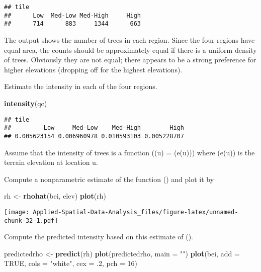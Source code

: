 \documentclass[
]{book}
\newenvironment{Shaded}{\begin{snugshade}}{\end{snugshade}}
\newcommand{\DataTypeTok}[1]{\textcolor[rgb]{0.13,0.29,0.53}{#1}}
\newcommand{\DecValTok}[1]{\textcolor[rgb]{0.00,0.00,0.81}{#1}}
\newcommand{\FloatTok}[1]{\textcolor[rgb]{0.00,0.00,0.81}{#1}}
\newcommand{\KeywordTok}[1]{\textcolor[rgb]{0.13,0.29,0.53}{\textbf{#1}}}
\newcommand{\NormalTok}[1]{#1}
\newcommand{\OtherTok}[1]{\textcolor[rgb]{0.56,0.35,0.01}{#1}}
\newcommand{\StringTok}[1]{\textcolor[rgb]{0.31,0.60,0.02}{#1}}
\begin{document}
\begin{verbatim}
## tile
##      Low  Med-Low Med-High     High 
##      714      883     1344      663
\end{verbatim}

The output shows the number of trees in each region. Since the four regions have equal area, the counts should be approximately equal if there is a uniform density of trees. Obviously they are not equal; there appears to be a strong preference for higher elevations (dropping off for the highest elevations).

Estimate the intensity in each of the four regions.

\begin{Shaded}
\begin{Highlighting}[]
\KeywordTok{intensity}\NormalTok{(qc)}
\end{Highlighting}
\end{Shaded}

\begin{verbatim}
## tile
##         Low     Med-Low    Med-High        High 
## 0.005623154 0.006960978 0.010593103 0.005228707
\end{verbatim}

Assume that the intensity of trees is a function (\lambda(u) = \rho(e(u))) where (e(u)) is the terrain elevation at location u.

Compute a nonparametric estimate of the function (\rho) and plot it by

\begin{Shaded}
\begin{Highlighting}[]
\NormalTok{rh <-}\StringTok{ }\KeywordTok{rhohat}\NormalTok{(bei, elev)}
\KeywordTok{plot}\NormalTok{(rh)}
\end{Highlighting}
\end{Shaded}

\texttt{[image: Applied-Spatial-Data-Analysis\_files/figure-latex/unnamed-chunk-32-1.pdf]}

Compute the predicted intensity based on this estimate of (\rho).

\begin{Shaded}
\begin{Highlighting}[]
\NormalTok{predictedrho <-}\StringTok{ }\KeywordTok{predict}\NormalTok{(rh)}
\KeywordTok{plot}\NormalTok{(predictedrho, }\DataTypeTok{main =} \StringTok{""}\NormalTok{)}
\KeywordTok{plot}\NormalTok{(bei, }\DataTypeTok{add =} \OtherTok{TRUE}\NormalTok{, }\DataTypeTok{cols =} \StringTok{"white"}\NormalTok{, }\DataTypeTok{cex =} \FloatTok{.2}\NormalTok{, }\DataTypeTok{pch =} \DecValTok{16}\NormalTok{)}
\end{Highlighting}
\end{Shaded}
\end{document}
